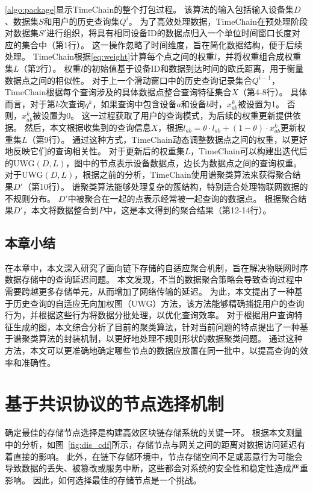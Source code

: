 \autoref{algo:package}显示TimeChain的整个打包过程。
该算法的输入包括输入设备集$D$、数据集$S$和用户的历史查询集$Q^i$。
为了高效处理数据，TimeChain在预处理阶段对数据集$S'$进行组织，将具有相同设备ID的数据点归入一个单位时间窗口长度对应的集合中（第1行）。
这一操作忽略了时间维度，旨在简化数据结构，便于后续处理。
TimeChain根据\autoref{eq:weight}计算每个点之间的权重$l$，并将权重组合成权重集$L$（第2行）。
权重$l$的初始值基于设备ID和数据到达时间的欧氏距离，用于衡量数据点之间的相似性。
对于上一个滑动窗口中的历史查询记录集合$Q^{i-1}$，TimeChain根据每个查询涉及的具体数据点整合查询特征集合$X$（第4-8行）。
具体而言，对于第$k$次查询$q^k$，如果查询中包含设备$a$和设备$b$时，$x^k_{ab}$被设置为1。
否则，$x^k_{ab}$被设置为0。
这一过程获取了用户的查询模式，为后续的权重更新提供依据。
然后，本文根据收集到的查询信息$X$，根据$l_{ab} = \theta \cdot l_{ab} + (1 - \theta) \cdot x_{ab}^k$更新权重集$L$（第9行）。
通过这种方式，TimeChain动态调整数据点之间的权重，以更好地反映它们的查询相关性。
对于更新后的权重集$L$，TimeChain可以构建出迭代后的UWG$(D,L)$，图中的节点表示设备数据点，边长为数据点之间的查询权重。
对于UWG$(D,L)$，根据之前的分析，TimeChain使用谱聚类算法来获得聚合结果$D'$（第10行）。
谱聚类算法能够处理复杂的簇结构，特别适合处理物联网数据的不规则分布。
$D'$中被聚合在一起的点表示经常被一起查询的数据点。
根据聚合结果$D'$，本文将数据整合到$P$中，这是本文得到的聚合结果（第12-14行）。

\section{本章小结}
在本章中，本文深入研究了面向链下存储的自适应聚合机制，旨在解决物联网时序数据存储中的查询延迟问题。
本文发现，不当的数据聚合策略会导致查询过程中需要跨越更多存储单元，从而增加了网络传输的延迟。
为此，本文提出了一种基于历史查询的自适应无向加权图（UWG）方法，该方法能够精确捕捉用户的查询行为，并根据这些行为将数据分批处理，以优化查询效率。
对于根据用户查询特征生成的图，本文综合分析了目前的聚类算法，针对当前问题的特点提出了一种基于谱聚类算法的封装机制，以更好地处理不规则形状的数据聚类问题。
通过这种方法，本文可以更准确地确定哪些节点的数据应放置在同一批中，以提高查询的效率和准确性。

\chapter{基于共识协议的节点选择机制}
\label{sec:consensus}
确定最佳的存储节点选择是构建高效区块链存储系统的关键一环。
根据本文测量中的分析，如图~\autoref{fig:dis_cdf}所示，存储节点与网关之间的距离对数据访问延迟有着直接的影响。
此外，在链下存储环境中，节点存储空间不足或恶意行为可能会导致数据的丢失、被篡改或服务中断，这些都会对系统的安全性和稳定性造成严重影响。
因此，如何选择最佳的存储节点是一个挑战。

